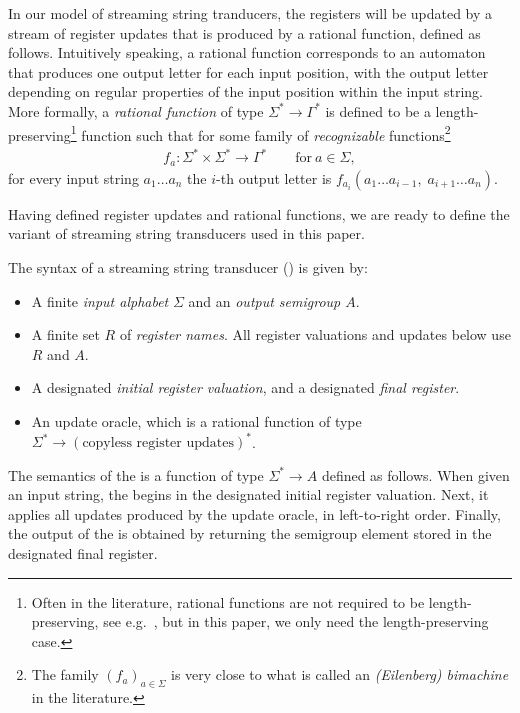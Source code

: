 In our model of streaming string tranducers, the registers will be updated by a
stream of register updates that is produced by a {rational function}, defined as
follows. Intuitively speaking, a rational function corresponds to an automaton
that produces one output letter for each input position, with the output letter
depending on regular properties of the input position within the input string.
More formally, a \emph{rational function} of type $\Sigma^* \to \Gamma^*$ is
defined to be a length-preserving\footnote{Often in the literature, rational
  functions are not required to be length-preserving, see
  e.g.~\cite[p.~525]{sakarovitch2009elements}, but in this paper, we only need
  the length-preserving case.} function such that for some family of
\emph{recognizable} functions\footnote{The family $(f_a)_{a\in\Sigma}$ is very
  close to what is called an \emph{(Eilenberg) bimachine} in the literature.}
\begin{align*}
 f_a \colon \Sigma^* \times \Sigma^* \to \Gamma^* \qquad\text{for}\ a \in \Sigma,
\end{align*}
for every input string $a_1 \dots a_n$ the $i$-th output letter is $f_{a_i}(a_1
\dots a_{i-1},\; a_{i+1} \dots a_n)$.

Having defined register updates and rational functions, we are ready to define the variant of streaming string transducers used in this paper.



\begin{definition}\label{def:usual-sst}
    The syntax of a streaming string transducer (\sst) is given by:
\begin{itemize}
    \item A finite \emph{input alphabet} $\Sigma$ and an \emph{output semigroup $A$}.
    \item A finite set $R$ of \emph{register names}. All register valuations and updates below use $R$ and $A$.
    \item A designated \emph{initial register valuation}, and a designated \emph{final register}.
    \item An update oracle, which is a rational function of type 
        $\Sigma^* \to (\text{copyless register updates})^*$.
\end{itemize}
\end{definition}
The semantics of the \sst{} is a function of type $\Sigma^* \to A$ defined as follows. When given an input string, the \sst{} begins in the designated initial register valuation. Next, it applies all updates produced by the update oracle, in left-to-right order. Finally, the output of the \sst{} is obtained by returning the semigroup element stored in the designated final register.

